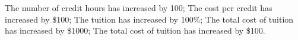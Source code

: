 \documentclass[11pt,answers]{exam}
\begin{document}
\begin{questions}
\begin{oneparchoices}
	\choice The number of credit hours has increased by 100;
	\choice The cost per credit has increased by \$100;
	\choice The tuition has increased by 100\%;
	\choice The total cost of tuition has increased by \$1000;
	\choice The total cost of tuition has increased by \$100.
\end{oneparchoices}
\end{questions}
\end{document}
